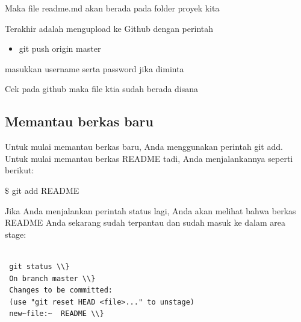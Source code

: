 \vspace{14pt}
\noindent 
{\fontsize{14pt}{14pt}\selectfont Maka file readme.md akan berada pada folder proyek kita \\} \par
\vspace{14pt}
\noindent 
{\fontsize{14pt}{14pt}\selectfont Terakhir adalah mengupload ke Github dengan perintah \\} \par
\begin{itemize}
	\item git push origin master
\end{itemize}

\vspace{14pt}
\noindent 
{\fontsize{14pt}{14pt}\selectfont masukkan username serta password jika diminta \\} \par
\noindent 
{\fontsize{14pt}{14pt}\selectfont Cek pada github maka file ktia sudah berada disana \\} \par
\vspace{14pt}
\subsection {Memantau berkas baru}
\vspace{14pt}
\noindent 
{\fontsize{14pt}{14pt}\selectfont Untuk mulai memantau berkas baru, Anda menggunakan perintah $  $git add. Untuk mulai memantau berkas README tadi, Anda menjalankannya seperti berikut: \\} \par
\vspace{14pt}
\noindent 
{\fontsize{14pt}{14pt}\selectfont  $  \$  $ git add README \\} \par
\vspace{14pt}
\noindent 
{\fontsize{14pt}{14pt}\selectfont Jika Anda menjalankan perintah $  $status $  $lagi, Anda akan melihat bahwa berkas README Anda sekarang sudah terpantau dan sudah masuk ke dalam area stage: \\} \par
\begin{verbatim}

 git status \\} 
 On branch master \\}
 Changes to be committed:
 (use "git reset HEAD <file>..." to unstage)
 new~file:~  README \\}
 
 \end{verbatim}
 
